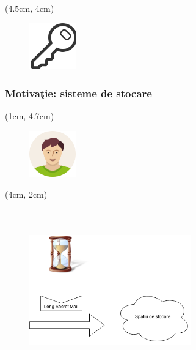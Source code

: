 \documentclass{beamer}
\begin{document}
\begin{frame}
{        \begin{textblock*}{4cm}(4.5cm, 4cm)
        \begin{figure}
            \includegraphics[width=2cm,height=2cm,keepaspectratio]{img/motivation/key-128.png}
        \end{figure}
        \end{textblock*}
    }
\end{frame}

\begin{frame}
    \frametitle{Motiva\c{t}ie: sisteme de stocare} 
     {

        \begin{textblock*}{2cm}(1cm, 4.7cm)
        \begin{figure}
            \includegraphics[width=2cm,height=2cm,keepaspectratio]{img/motivation/boy-128.png}
        \end{figure}
        \end{textblock*}
    }
     {

        \begin{textblock*}{4cm}(4cm, 2cm)
        \begin{figure}
            \includegraphics[width=7cm,height=7cm,keepaspectratio]{img/motivation/storage-system.png}
        \end{figure}
        \end{textblock*}
    }
     {

}
\end{frame}
\end{document}
